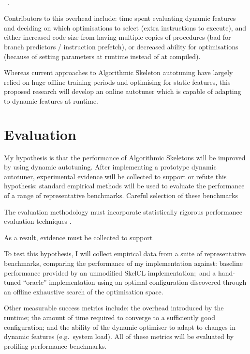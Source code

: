 ~\cite{Steuwer2011, Steuwer2013a}

~\cite{Steuwer2012}.

Contributors to this overhead include: time spent evaluating dynamic
features and deciding on which optimisations to select (extra
instructions to execute), and either increased code size from having
multiple copies of procedures (bad for branch predictors / instruction
prefetch), or decreased ability for optimisations (because of setting
parameters at runtime instead of at compiled).

Whereas current approaches to Algorithmic Skeleton autotuning have
largely relied on huge offline training periods and optimising for
static features, this proposed research will develop an online
autotuner which is capable of adapting to dynamic features at runtime.

\section{Evaluation}
My hypothesis is that the performance of Algorithmic Skeletons will be
improved by using dynamic autotuning. After implementing a prototype
dynamic autotuner, experimental evidence will be collected to support
or refute this hypothesis: standard empirical methods will be used to
evaluate the performance of a range of representative
benchmarks. Careful selection of these benchmarks

The evaluation methodology must incorporate statistically rigorous
performance evaluation techniques \cite{Georges2007}.

As a result, evidence must be collected to support

To test this hypothesis, I will
collect empirical data from a suite of representative benchmarks,
comparing the performance of my implementation against: baseline
performance provided by an unmodified SkelCL implementation;\ and a
hand-tuned ``oracle'' implementation using an optimal configuration
discovered through an offline exhaustive search of the optimisation
space.

Other measurable success metrics include: the overhead introduced by
the runtime; the amount of time required to converge to a sufficiently
good configuration; and the ability of the dynamic optimiser to adapt
to changes in dynamic features (e.g.\ system load). All of these
metrics will be evaluated by profiling performance benchmarks.


